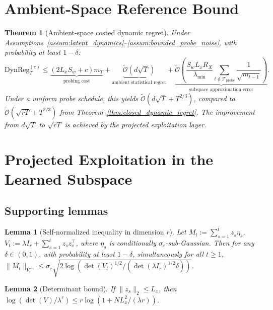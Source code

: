 \documentclass{article}
\newcommand{\cTprobe}{\mathcal{T}_{\mathrm{probe}}}
\newcommand{\tilO}{\widetilde{\mathcal{O}}}
\newcommand{\DynReg}{\mathrm{DynReg}}
\newtheorem{lemma}{Lemma}
\newtheorem{theorem}{Theorem}
\begin{document}
\section{Ambient-Space Reference Bound}
\label{app:ambient_reference}

\begin{theorem}[Ambient-space costed dynamic regret]
\label{thm:ambient_regret}
Under Assumptions~\ref{assum:latent_dynamics}--\ref{assum:bounded_probe_noise}, with probability at least $1-\delta$:
\[
    \DynReg_T^{(c)} \le \underbrace{(2 L_x S_w + c) m_T}_{\text{probing cost}}
    + \underbrace{\tilO(d \sqrt{T})}_{\text{ambient statistical regret}}
    + \underbrace{\tilO\!\left( \frac{S_w L_x R_X}{\lambda_{\min}} \sum_{t \notin \cTprobe} \frac{1}{\sqrt{m_{t-1}}} \right)}_{\text{subspace approximation error}}.
\]
Under a uniform probe schedule, this yields $\tilO(d\sqrt{T} + T^{2/3})$, compared to $\tilO(\sqrt{rT} + T^{2/3})$ from Theorem~\ref{thm:closed_dynamic_regret}.
The improvement from $d\sqrt{T}$ to $\sqrt{rT}$ is achieved by the projected exploitation layer.
\end{theorem}

\section{Projected Exploitation in the Learned Subspace}
\label{app:projected_exploitation}

\subsection{Supporting lemmas}

\begin{lemma}[Self-normalized inequality in dimension $r$]
\label{lem:self_normalized_r}
Let $M_t := \sum_{s=1}^t z_s \eta_s$, $V_t := \lambda I_r + \sum_{s=1}^t z_s z_s^\top$, where $\eta_s$ is conditionally $\sigma_\varepsilon$-sub-Gaussian. Then for any $\delta\in(0,1)$, with probability at least $1-\delta$, simultaneously for all $t\ge 1$,
$\|M_t\|_{V_t^{-1}} \le \sigma_\varepsilon \sqrt{2\log(\det(V_t)^{1/2}/(\det(\lambda I_r)^{1/2}\delta))}$.
\end{lemma}

\begin{lemma}[Determinant bound]
\label{lem:det_bound_r}
If $\|z_s\|_2\le L_x$, then $\log(\det(V)/\lambda^r) \le r\log(1+N L_x^2/(\lambda r))$.
\end{lemma}
\end{document}
